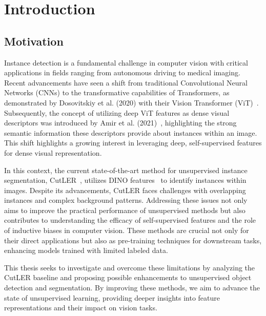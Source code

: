 \chapter{Introduction}\label{chap:introduction}

\section{Motivation}
Instance detection is a fundamental challenge in computer vision with critical applications in fields ranging from autonomous driving to medical imaging. Recent advancements have seen a shift from traditional Convolutional Neural Networks (CNNs) to the transformative capabilities of Transformers, as demonstrated by Dosovitskiy et al. (2020) with their Vision Transformer (ViT)~\cite{dosovitskiy2020image}. Subsequently, the concept of utilizing deep ViT features as dense visual descriptors was introduced by Amir et al. (2021)~\cite{amir2021deep}, highlighting the strong semantic information these descriptors provide about instances within an image. This shift highlights a growing interest in leveraging deep, self-supervised features for dense visual representation.

In this context, the current state-of-the-art method for unsupervised instance segmentation, CutLER~\cite{wang2023cut}, utilizes DINO features~\cite{caron2021emerging} to identify instances within images. Despite its advancements, CutLER faces challenges with overlapping instances and complex background patterns. Addressing these issues not only aims to improve the practical performance of unsupervised methods but also contributes to understanding the efficacy of self-supervised features and the role of inductive biases in computer vision. These methods are crucial not only for their direct applications but also as pre-training techniques for downstream tasks, enhancing models trained with limited labeled data.

This thesis seeks to investigate and overcome these limitations by analyzing the CutLER baseline and proposing possible enhancements to unsupervised object detection and segmentation. By improving these methods, we aim to advance the state of unsupervised learning, providing deeper insights into feature representations and their impact on vision tasks.

